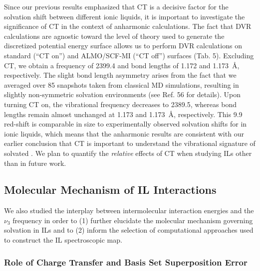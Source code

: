Since our previous results emphasized that CT is a decisive factor for the  solvation shift between different ionic liquids, it is important to investigate the significance of CT in the context of anharmonic calculations. The fact that DVR calculations are agnostic toward the level of theory used to generate the discretized potential energy surface allows us to perform DVR calculations on standard (``CT on'') and ALMO/SCF-MI (``CT off'') surfaces (Tab. 5). Excluding CT, we obtain a frequency of \SI{2399.4}{\wavenumber} and bond lengths of \num{1.172} and \SI{1.173}{\angstrom}, respectively. The slight bond length asymmetry arises from the fact that we averaged over \num{85} snapshots taken from classical MD simulations, resulting in slightly non-symmetric solvation environments (see Ref. 56 for details). Upon turning CT on, the vibrational frequency decreases to \SI{2389.5}{\wavenumber}, whereas bond lengths remain almost unchanged at \num{1.173} and \SI{1.173}{\angstrom}, respectively. This \SI{9.9}{\wavenumber} red-shift is comparable in size to experimentally observed solvation shifts for  in ionic liquids,\cite{Brinzer2015,choi_vibrational_2011} which means that the anharmonic results are consistent with our earlier conclusion that CT is important to understand the vibrational signature of solvated .  We plan to quantify the \emph{relative} effects of CT when studying ILs other than \ce{[C4C1im][PF6]} in future work.

\subsection{Molecular Mechanism of \textendash{}IL Interactions}
\label{paper_02:ssec:IIIC}

We also studied the interplay between intermolecular interaction energies and the  \(\nu_{3}\) frequency in order to (1) further elucidate the molecular mechanism governing  solvation in ILs and to (2) inform the selection of computational approaches used to construct the \textendash{}IL spectroscopic map.\cite{Daly2016}

\subsubsection{Role of Charge Transfer and Basis Set Superposition Error}
\label{paper_02:sssec:IIIC1}

